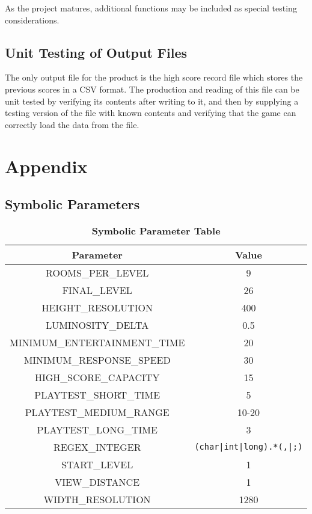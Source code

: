 \documentclass[12pt, titlepage]{article}
\begin{document}
		As the project matures, additional functions may be included as special testing considerations.

	\subsection{Unit Testing of Output Files}
		The only output file for the product is the high score record file which stores the previous scores in a CSV format.  The production and reading of this file can be unit tested by verifying its contents after writing to it, and then by supplying a testing version of the file with known contents and verifying that the game can correctly load the data from the file.

\newpage





\newpage
\section{Appendix}
\label{section7}

	\subsection{Symbolic Parameters}

		\begin{table}[h!]
			\centering
			\caption{\textbf{Symbolic Parameter Table}}
			\label{symbolicParameters}
			\bigskip
			\def\arraystretch{1.6}


			\begin{tabular}{| c | c |}
				\bottomrule
				\textbf{Parameter} & \textbf{Value} \\
				\hline
				ROOMS\_PER\_LEVEL & 9 \\
				FINAL\_LEVEL & 26 \\
				HEIGHT\_RESOLUTION & 400 \\
				LUMINOSITY\_DELTA & 0.5 \\
				MINIMUM\_ENTERTAINMENT\_TIME & 20 \\
				MINIMUM\_RESPONSE\_SPEED & 30 \\
				HIGH\_SCORE\_CAPACITY & 15 \\
				PLAYTEST\_SHORT\_TIME & 5 \\
				PLAYTEST\_MEDIUM\_RANGE & 10-20 \\
				PLAYTEST\_LONG\_TIME & 3 \\
				REGEX\_INTEGER & \lstinline$(char|int|long).*(,|;)$ \\
				START\_LEVEL & 1 \\
				VIEW\_DISTANCE & 1 \\
				WIDTH\_RESOLUTION & 1280 \\
				\toprule
			\end{tabular}
		\end{table}
\end{document}
